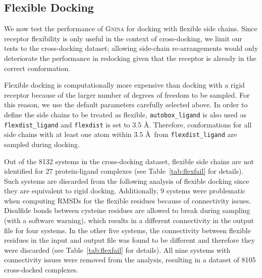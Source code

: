 \documentclass[journal=jcisd8,manuscript=article]{achemso}
\begin{document}
\subsection{Flexible Docking}

We now test the performance of \textsc{Gnina} for docking with flexible side chains. Since receptor flexibility is only useful in the context of cross-docking, we limit our tests to the cross-docking dataset; allowing side-chain re-arrangements would only deteriorate the performance in redocking given that the receptor is already in the correct conformation.

Flexible docking is computationally more expensive than docking with a rigid receptor because of the larger number of degrees of freedom to be sampled. For this reason, we use the default parameters carefully selected above. In order to define the side chains to be treated as flexible, \texttt{autobox\_ligand} is also used as \texttt{flexdist\_ligand} and \texttt{flexdist} is set to 3.5 \AA. Therefore, conformations for all side chains with at least one atom within 3.5 \AA\, from \texttt{flexdist\_ligand} are sampled during docking.

Out of the 8132 systems in the cross-docking dataset, flexible side chains are not identified for 27 protein-ligand complexes (see Table~\ref{tab:flexfail} for details). Such systems are discarded from the following analysis of flexible docking since they are equivalent to rigid docking. Additionally, 9 systems were problematic when computing RMSDs for the flexible residues because of connectivity issues. Disulfide bonds between cysteine residues are allowed to break during sampling (with a software warning), which results in a different connectivity in the output file for four systems. In the other five systems, the connectivity between flexible residues in the input and output file was found to be different and therefore they were discarded (see Table~\ref{tab:flexfail} for details). All nine systems with connectivity issues were removed from the analysis, resulting in a dataset of 8105 cross-docked complexes.
\end{document}
